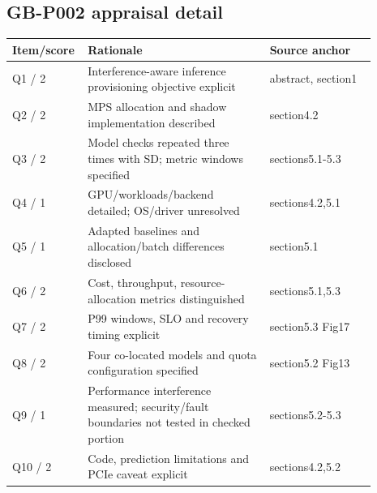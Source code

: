 \documentclass[12pt,a4paper]{article}
\begin{document}
\subsection{GB-P002 appraisal detail}
\begin{longtable}{p{0.13\linewidth}p{0.48\linewidth}p{0.28\linewidth}}
\toprule
Item/\allowbreak{}score & Rationale & Source anchor\\\midrule
\endhead
Q1 /\allowbreak{} 2 & Interference-aware inference provisioning objective explicit & abstract, section1\\
Q2 /\allowbreak{} 2 & MPS allocation and shadow implementation described & section4.2\\
Q3 /\allowbreak{} 2 & Model checks repeated three times with SD; metric windows specified & sections5.1-5.3\\
Q4 /\allowbreak{} 1 & GPU/\allowbreak{}workloads/\allowbreak{}backend detailed; OS/\allowbreak{}driver unresolved & sections4.2,5.1\\
Q5 /\allowbreak{} 1 & Adapted baselines and allocation/\allowbreak{}batch differences disclosed & section5.1\\
Q6 /\allowbreak{} 2 & Cost, throughput, resource-allocation metrics distinguished & sections5.1,5.3\\
Q7 /\allowbreak{} 2 & P99 windows, SLO and recovery timing explicit & section5.3 Fig17\\
Q8 /\allowbreak{} 2 & Four co-located models and quota configuration specified & section5.2 Fig13\\
Q9 /\allowbreak{} 1 & Performance interference measured; security/\allowbreak{}fault boundaries not tested in checked portion & sections5.2-5.3\\
Q10 /\allowbreak{} 2 & Code, prediction limitations and PCIe caveat explicit & sections4.2,5.2\\
\bottomrule
\end{longtable}
\end{document}
